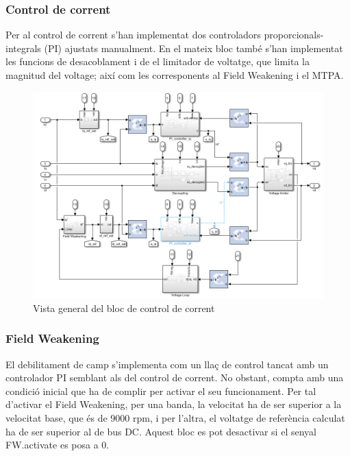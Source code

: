 {    \subsubsection{ Control de corrent }
    { 
        Per al control de corrent s'han implementat dos controladors
        proporcionals-integrals (PI) ajustats manualment. En el mateix bloc
        també s'han implementat les funcions de desacoblament i de el limitador
        de voltatge, que limita la magnitud del voltage; així com les
        corresponents al Field Weakening i el MTPA.

        \begin{figure}[!htb]
            \centering
            \captionsetup{justification=centering, margin=1.5cm}
            \includegraphics[width=12cm]
                { img/4_implementacio/current_control.png }
            \caption{ Vista general del bloc de control de corrent }
        \end{figure}
    }

    \subsubsection{ Field Weakening }
    { 
        El debilitament de camp s'implementa com un llaç de control tancat amb
        un controlador PI semblant als del control de corrent. No obstant,
        compta amb una condició inicial que ha de complir per activar el seu
        funcionament. Per tal d'activar el Field Weakening, per una banda, la
        velocitat ha de ser superior a la velocitat base, que és de 9000 rpm, i
        per l'altra, el voltatge de referència calculat ha de ser superior al
        de bus DC. Aquest bloc es pot desactivar si el senyal FW.activate es
        posa a 0.
    
}}
